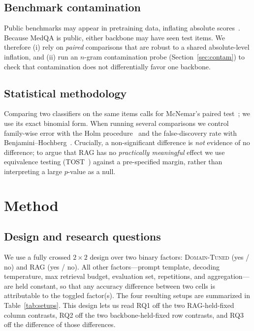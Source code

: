 \documentclass[11pt,a4paper]{article}
\begin{document}
\subsection{Benchmark contamination}
Public benchmarks may appear in pretraining data, inflating absolute
scores~\cite{magar2022contamination,sainz2023contamination}. Because MedQA is
public, either backbone may have seen test items. We therefore (i) rely on
\emph{paired} comparisons that are robust to a shared absolute-level inflation,
and (ii) run an $n$-gram contamination probe (Section~\ref{sec:contam}) to check
that contamination does not differentially favor one backbone.

\subsection{Statistical methodology}
Comparing two classifiers on the same items calls for McNemar's paired
test~\cite{dietterich1998mcnemar}; we use its exact binomial form. When running
several comparisons we control family-wise error with the Holm
procedure~\cite{holm1979} and the false-discovery rate with
Benjamini--Hochberg~\cite{benjamini1995fdr}. Crucially, a non-significant
difference is \emph{not} evidence of no difference; to argue that RAG has no
\emph{practically meaningful} effect we use equivalence testing
(TOST~\cite{lakens2017tost}) against a pre-specified margin, rather than
interpreting a large $p$-value as a null.

\section{Method}

\subsection{Design and research questions}

We use a fully crossed $2\!\times\!2$ design over two binary factors:
\textsc{Domain-Tuned} (yes / no) and \textsc{RAG} (yes / no). All
other factors---prompt template, decoding temperature, max retrieval
budget, evaluation set, repetitions, and aggregation---are held
constant, so that any accuracy difference between two cells is attributable to
the toggled factor(s). The four resulting setups are summarized in
Table~\ref{tab:setups}. This design lets us read RQ1 off the two
RAG-held-fixed column contrasts, RQ2 off the two backbone-held-fixed row
contrasts, and RQ3 off the difference of those differences.
\end{document}
